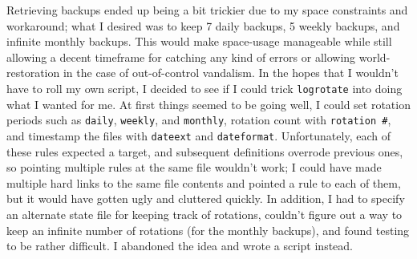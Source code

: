 \documentclass{article}
\begin{document}
Retrieving backups ended up being a bit trickier due to my space constraints and workaround; what I desired was to keep 7 daily backups, 5 weekly backups, and infinite monthly backups.  This would make space-usage manageable while still allowing a decent timeframe for catching any kind of errors or allowing world-restoration in the case of out-of-control vandalism.  In the hopes that I wouldn't have to roll my own script, I decided to see if I could trick \texttt{logrotate} into doing what I wanted for me.  At first things seemed to be going well, I could set rotation periods such as \texttt{daily}, \texttt{weekly}, and \texttt{monthly}, rotation count with \texttt{rotation #}, and timestamp the files with \texttt{dateext} and \texttt{dateformat}.  Unfortunately, each of these rules expected a target, and subsequent definitions overrode previous ones, so pointing multiple rules at the same file wouldn't work; I could have made multiple hard links to the same file contents and pointed a rule to each of them, but it would have gotten ugly and cluttered quickly.  In addition, I had to specify an alternate state file for keeping track of rotations, couldn't figure out a way to keep an infinite number of rotations (for the monthly backups), and found testing to be rather difficult.  I abandoned the idea and wrote a script instead.
\end{document}
